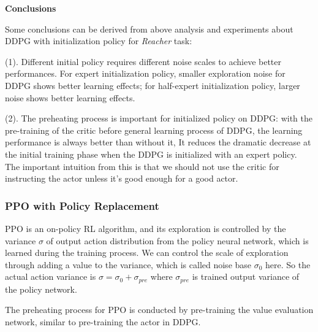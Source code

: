 \documentclass{article}
\begin{document}
\textbf{Conclusions}

Some conclusions can be derived from above analysis and experiments about DDPG with initialization policy for \textit{Reacher} task:

(1). Different initial policy requires different noise scales to achieve better performances. For expert initialization policy, smaller exploration noise for DDPG shows better learning effects; for half-expert initialization policy, larger noise shows better learning effects.

(2). The preheating process is important for initialized policy on DDPG: with the pre-training of the critic before general learning process of DDPG, the learning performance is always better than without it, It reduces the dramatic decrease at the initial training phase when the DDPG is initialized with an expert policy. The important intuition from this is that we should not use the critic for instructing the actor unless it's good enough for a good actor.


\subsubsection{PPO with Policy Replacement}
PPO is an on-policy RL algorithm, and its exploration is controlled by the variance $\sigma$ of output action distribution from the policy neural network, which is learned during the training process. We can control the scale of exploration through adding a value to the variance, which is called noise base $\sigma_0$ here. So the actual action variance is $\sigma =\sigma_0+\sigma_{pre}$ where $\sigma_{pre}$ is trained output variance of the policy network.

The preheating process for PPO is conducted by pre-training the value evaluation network, similar to pre-training the actor in DDPG. 
\end{document}
